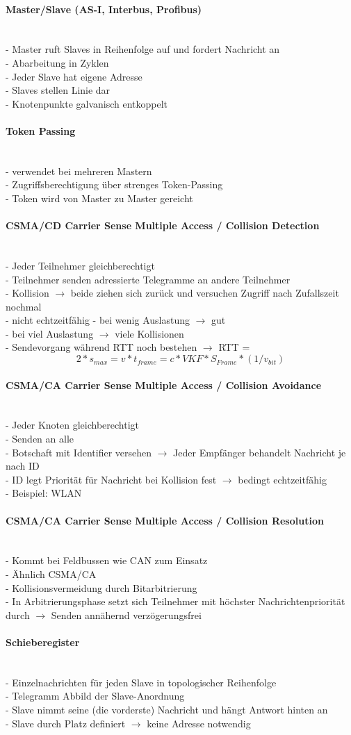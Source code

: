 \documentclass{article}
\newcommand{\myparagraph}[1]{\paragraph{#1}\mbox{}\\}
\newcommand{\follows}{$\rightarrow$ }
\begin{document}
	\myparagraph{Master/Slave (AS-I, Interbus, Profibus)}
	- Master ruft Slaves in Reihenfolge auf und fordert Nachricht an \\
	- Abarbeitung in Zyklen \\
	- Jeder Slave hat eigene Adresse \\
	- Slaves stellen Linie dar \\
	- Knotenpunkte galvanisch entkoppelt
	
	\myparagraph{Token Passing}
	- verwendet bei mehreren Mastern \\
	- Zugriffsberechtigung über strenges Token-Passing \\
	- Token wird von Master zu Master gereicht
	
	\myparagraph{CSMA/CD Carrier Sense Multiple Access / Collision Detection}
	- Jeder Teilnehmer gleichberechtigt \\
	- Teilnehmer senden adressierte Telegramme an andere Teilnehmer \\
	- Kollision \follows beide ziehen sich zurück und versuchen Zugriff nach Zufallszeit nochmal \\
	- nicht echtzeitfähig
	- bei wenig Auslastung \follows gut \\
	- bei viel Auslastung \follows viele Kollisionen \\
	- Sendevorgang während \ac{RTT} noch bestehen \follows \ac{RTT} = $$2 * s_{max} = v * t_{frame} = c * VKF * S_{Frame} * (1 / v_{bit})$$
	
	\myparagraph{CSMA/CA Carrier Sense Multiple Access / Collision Avoidance}
	- Jeder Knoten gleichberechtigt \\
	- Senden an alle \\
	- Botschaft mit Identifier versehen \follows Jeder Empfänger behandelt Nachricht je nach ID \\
	- ID legt Priorität für Nachricht bei Kollision fest \follows bedingt echtzeitfähig \\
	- Beispiel: WLAN
	\myparagraph{CSMA/CA Carrier Sense Multiple Access / Collision Resolution}
	- Kommt bei Feldbussen wie CAN zum Einsatz \\
	- Ähnlich CSMA/CA \\
	- Kollisionsvermeidung durch Bitarbitrierung \\
	- In Arbitrierungsphase setzt sich Teilnehmer mit höchster Nachrichtenpriorität durch \follows Senden annähernd verzögerungsfrei
	
	\myparagraph{Schieberegister}
	- Einzelnachrichten für jeden Slave in topologischer Reihenfolge\\
	- Telegramm Abbild der Slave-Anordnung \\
	- Slave nimmt seine (die vorderste) Nachricht und hängt Antwort hinten an \\
	- Slave durch Platz definiert \follows keine Adresse notwendig
	
\end{document}
